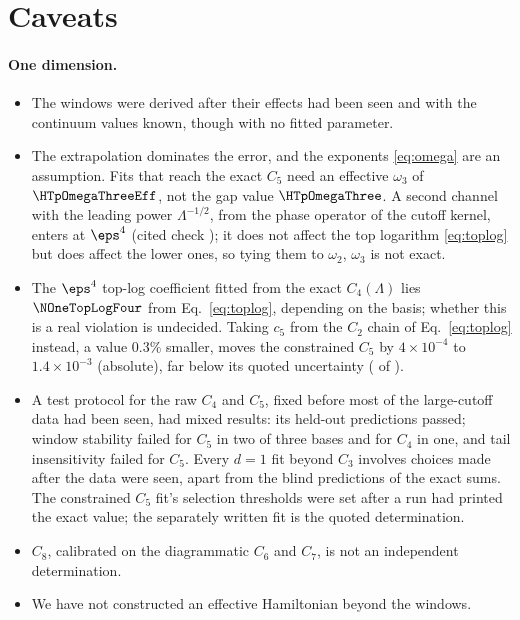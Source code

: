 \section{Caveats}\label{sec:caveats}

\paragraph{One dimension.}
\begin{itemize}
\item The windows were derived after their effects had been seen and with the continuum values known, though with no
 fitted parameter.
\item The extrapolation dominates the error, and the exponents \eqref{eq:omega} are an assumption. Fits that reach the
 exact $C_5$ need an effective $\omega_3$ of $\HTpOmegaThreeEff$, not the gap value $\HTpOmegaThree$. A second channel
 with the leading power $\Lambda^{-1/2}$, from the phase operator of the cutoff kernel, enters at $\eps^4$ (cited check
 ); it does not affect the top logarithm \eqref{eq:toplog} but does affect
 the lower ones, so tying them to $\omega_2$, $\omega_3$ is not exact.
\item The $\eps^4$ top-log coefficient fitted from the exact $C_4(\Lambda)$ lies $\NOneTopLogFour$ from
 Eq.~\eqref{eq:toplog}, depending on the basis; whether this is a real violation is undecided. Taking $c_5$ from the
 $C_2$ chain of Eq.~\eqref{eq:toplog} instead, a value $0.3\%$ smaller, moves the constrained $C_5$ by $4\times10^{-4}$ to
 $1.4\times10^{-3}$ (absolute), far below its quoted uncertainty ( of ).
\item A test protocol for the raw $C_4$ and $C_5$, fixed before most of the large-cutoff data had been seen, had mixed
 results: its held-out predictions passed; window stability failed for $C_5$ in two of three bases and for $C_4$ in one,
 and tail insensitivity failed for $C_5$. Every $d=1$ fit beyond $C_3$ involves choices made after the data were seen, apart from the blind
 predictions of the exact sums. The constrained $C_5$ fit's selection thresholds were set after a run had printed the
 exact value; the separately written fit is the quoted determination.
\item $C_8$, calibrated on the diagrammatic $C_6$ and $C_7$, is not an independent determination.
\item We have not constructed an effective Hamiltonian beyond the windows.
\end{itemize}
